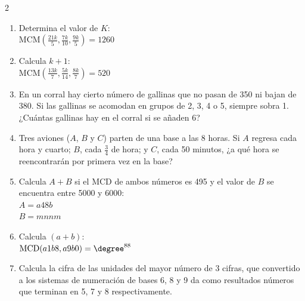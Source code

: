 \documentclass[10pt]{article}
\begin{document}
\begin{multicols}{2}
\begin{enumerate}[label=\textbf{\arabic*.}, itemsep=0.4cm]
			\item Determina el valor de \( K \): \\
			\( \text{MCM}\left( \frac{21k}{5}, \frac{7k}{10}, \frac{9k}{5} \right) = 1260 \)

			\item Calcula \( k + 1 \): \\
			\( \text{MCM}\left( \frac{13k}{7}, \frac{5k}{14}, \frac{8k}{7} \right) = 520 \)

			\item En un corral hay cierto número de gallinas que no pasan de 350 ni bajan de 380. Si las gallinas se acomodan en grupos de 2, 3, 4 o 5, siempre sobra 1. ¿Cuántas gallinas hay en el corral si se añaden 6?

			\item Tres aviones (\( A \), \( B \) y \( C \)) parten de una base a las 8 horas. Si \( A \) regresa cada hora y cuarto; \( B \), cada \( \frac{3}{4} \) de hora; y \( C \), cada 50 minutos, ¿a qué hora se reencontrarán por primera vez en la base?

			\item Calcula \( A + B \) si el MCD de ambos números es 495 y el valor de \( B \) se encuentra entre 5000 y 6000: \\
			\( A = a48b \) \\
			\( B = mnnm \)

			\item Calcula \( (a + b) \): \\
			\( \text{MCD}(a1b8, a9b0) = \degree^{88} \)

			\item Calcula la cifra de las unidades del mayor número de 3 cifras, que convertido a los sistemas de numeración de bases 6, 8 y 9 da como resultados números que terminan en 5, 7 y 8 respectivamente.




		\end{enumerate}

\end{multicols}
\end{document}
